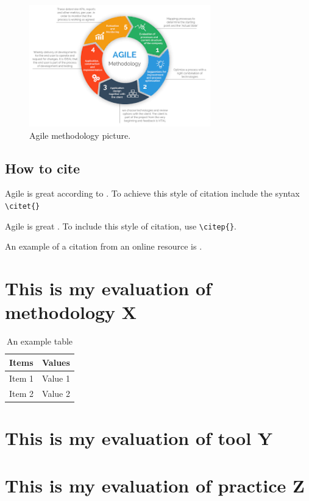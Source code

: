 \documentclass[11pt]{article}
\begin{document}
\begin{figure}[!ht]
\centering
\includegraphics[width=0.7\textwidth]{agilePic}\caption{Agile methodology picture.}\label{fig:agile} 
\end{figure}

\subsection{How to cite}

Agile is great according to \citet{schwaber:2002}. To achieve this style of citation include the syntax \verb|\citet{}|



Agile is great \citep{schwaber:2002}. To include this style of citation, use \verb|\citep{}|.

An example of a citation from an online resource is \cite{WinNT}.

\section{This is my evaluation of methodology X}

\begin{table}[htb]
\caption{An example table}
\bigskip
\begin{center}
\label{Example-Table}
\begin{tabular}{|l|l|}
\hline
Items & Values \\
\hline
\hline
Item 1 & Value 1 \\
Item 2 & Value 2 \\
\hline
\end{tabular}
\end{center}
\end{table}

\section{This is my evaluation of tool Y}
\section{This is my evaluation of practice Z}





\end{document}

